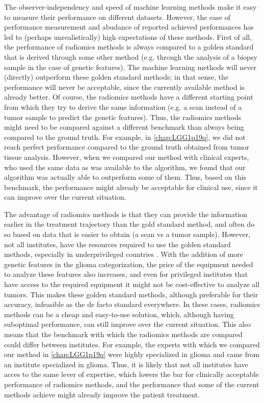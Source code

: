 The observer-independency and speed of machine learning methods make it easy to measure their performance on different datasets.
However, the ease of performance measurement and abudance of reported achieved performances has led to (perhaps unrealistically) high expectations of these methods.
First of all, the performance of radiomics methods is always compared to a golden standard that is derived through some other method (e.g. through the analysis of a biopsy sample in the case of genetic features).
The machine learning methods will never (directly) outperform these golden standard methods; in that sense, the performance will never be acceptable, since the currently available method is already better.
Of course, the radiomics methods have a different starting point from which they try to derive the same information (e.g. a scan instead of a tumor sample to predict the genetic features).
Thus, the radiomics methods might need to be compared against a different benchmark than always being compared to the ground truth.
For example, in \cref{chap:LGG1p19q}, we did not reach perfect performance compared to the ground truth obtained from tumor tissue analysis.
However, when we compared our method with clinical experts, who used the same data as was available to the algorithm, we found that our algorithm was actually able to outperform some of them.
Thus, based on this benchmark, the performance might already be acceptable for clinical use, since it can improve over the current situation.

The advantage of radiomics methods is that they can provide the information earlier in the treatment trajectory than the gold standard method, and often do so based on data that is easier to obtain (a scan vs a tumor sample).
However, not all institutes, have the resources required to use the golden standard methods, especially in underprivileged countries \autocite{santosh2019india}.
With the addition of more genetic features in the glioma categorization, the price of the equipment needed to analyze these features also increases, and even for privileged institutes that have access to the required equipment it might not be cost-effective to analyze all \glspl{tumor}\autocite{malzkorn2016practical,dewitt2017costIDH}.
This makes these golden standard methods, although preferable for their accuracy, infeasible as the de facto standard everywhere.
In these cases, radiomics methods can be a cheap and easy-to-use solution, which, although having suboptimal performance, can still improve over the current situation.
This also means that the benchmark with which the radiomics methods are compared could differ between institutes.
For example, the experts with which we compared our method in \cref{chap:LGG1p19q} were highly specialized in glioma and came from an institute specialized in glioma.
Thus, it is likely that not all institutes have acces to the same lever of expertise, which lowers the bar for clinically acceptable performance of radiomics methods, and the performance that some of the current methods achieve might already improve the patient treatment.

